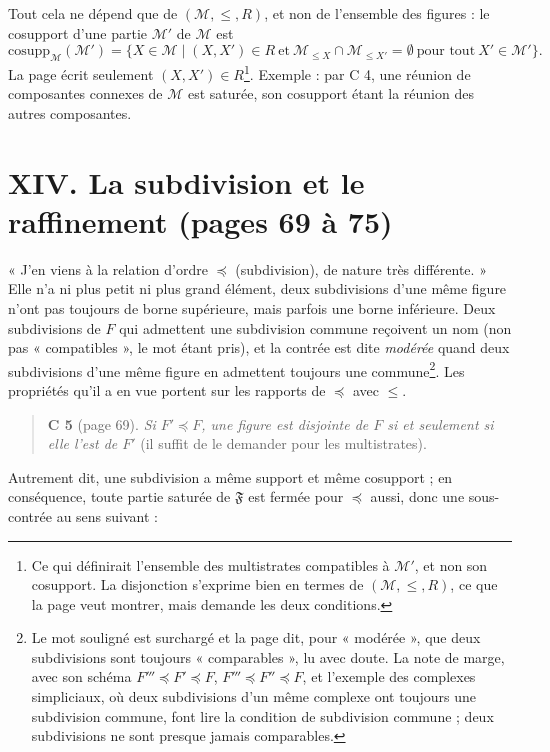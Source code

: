 \documentclass[11pt,a4paper]{article}
\begin{document}
Tout cela ne dépend que de $(\mathcal{M}, \leq, R)$, et non de l'ensemble des
figures : le cosupport d'une partie $\mathcal{M}'$ de $\mathcal{M}$ est
\[
\mathrm{cosupp}_{\mathcal{M}}(\mathcal{M}') = \{X \in \mathcal{M} \mid (X, X')
\in R \ \text{et}\ \mathcal{M}_{\leq X} \cap \mathcal{M}_{\leq X'} = \emptyset \
\text{pour tout}\ X' \in \mathcal{M}'\}.
\]
La page écrit seulement $(X, X') \in R$\footnote{Ce qui définirait l'ensemble
des multistrates compatibles à $\mathcal{M}'$, et non son cosupport. La
disjonction s'exprime bien en termes de $(\mathcal{M}, \leq, R)$, ce que la page
veut montrer, mais demande les deux conditions.}.
Exemple : par C 4, une réunion de composantes connexes de $\mathcal{M}$ est
saturée, son cosupport étant la réunion des autres composantes.

\section*{XIV. La subdivision et le raffinement (pages 69 à 75)}

« J'en viens à la relation d'ordre $\preccurlyeq$ (subdivision), de nature très
différente. » Elle n'a ni plus petit ni plus grand élément, deux subdivisions
d'une même figure n'ont pas toujours de borne supérieure, mais parfois une
borne inférieure. Deux subdivisions de $F$ qui admettent une subdivision
commune reçoivent un nom (non pas « compatibles », le mot étant pris), et la
contrée est dite \emph{modérée} quand deux subdivisions d'une même figure en
admettent toujours une commune\footnote{Le mot souligné est surchargé et la
page dit, pour « modérée », que deux subdivisions sont toujours « comparables »,
lu avec doute. La note de marge, avec son schéma $F''' \preccurlyeq F'
\preccurlyeq F$, $F''' \preccurlyeq F'' \preccurlyeq F$, et l'exemple des
complexes simpliciaux, où deux subdivisions d'un même complexe ont toujours une
subdivision commune, font lire la condition de subdivision commune ; deux
subdivisions ne sont presque jamais comparables.}. Les propriétés qu'il a en
vue portent sur les rapports de $\preccurlyeq$ avec $\leq$.

\begin{quote}
\textbf{C 5} (page 69). \emph{Si $F' \preccurlyeq F$, une figure est disjointe de
$F$ si et seulement si elle l'est de $F'$} (il suffit de le demander pour les
multistrates).
\end{quote}

Autrement dit, une subdivision a même support et même cosupport ; en
conséquence, toute partie saturée de $\mathfrak{F}$ est fermée pour
$\preccurlyeq$ aussi, donc une sous-contrée au sens suivant :
\end{document}
